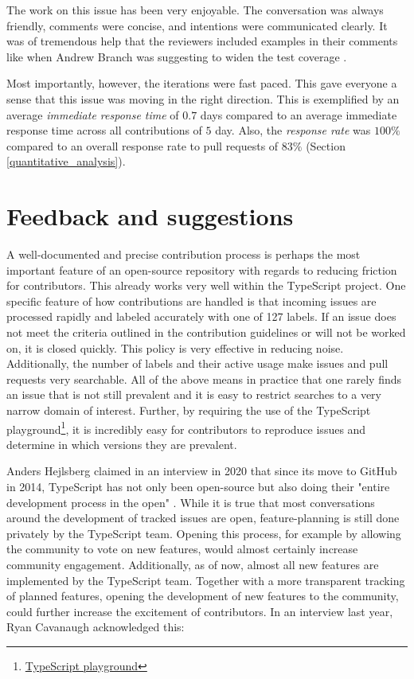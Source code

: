 \documentclass[12pt]{scrartcl}
\begin{document}
The work on this issue has been very enjoyable. The conversation was always friendly, comments were concise, and intentions were communicated clearly. It was of tremendous help that the reviewers included examples in their comments like when Andrew Branch was suggesting to widen the test coverage \cite{41928Comment4}.

Most importantly, however, the iterations were fast paced. This gave everyone a sense that this issue was moving in the right direction. This is exemplified by an average \textit{immediate response time} of $0.7$ days compared to an average immediate response time across all contributions of $5$ day. Also, the \textit{response rate} was $100\%$ compared to an overall response rate to pull requests of $83\%$ (Section \ref{quantitative_analysis}).

\section{Feedback and suggestions}
\label{feedback}

A well-documented and precise contribution process is perhaps the most important feature of an open-source repository with regards to reducing friction for contributors. This already works very well within the TypeScript project. One specific feature of how contributions are handled is that incoming issues are processed rapidly and labeled accurately with one of 127 labels. If an issue does not meet the criteria outlined in the contribution guidelines or will not be worked on, it is closed quickly. This policy is very effective in reducing noise. Additionally, the number of labels and their active usage make issues and pull requests very searchable. All of the above means in practice that one rarely finds an issue that is not still prevalent and it is easy to restrict searches to a very narrow domain of interest. Further, by requiring the use of the TypeScript playground\footnote{\href{https://www.typescriptlang.org/play}{TypeScript playground}}, it is incredibly easy for contributors to reproduce issues and determine in which versions they are prevalent.

Anders Hejlsberg claimed in an interview in 2020 that since its move to GitHub in 2014, TypeScript has not only been open-source but also doing their "entire development process in the open" \cite{Tung2020}. While it is true that most conversations around the development of tracked issues are open, feature-planning is still done privately by the TypeScript team. Opening this process, for example by allowing the community to vote on new features, would almost certainly increase community engagement. Additionally, as of now, almost all new features are implemented by the TypeScript team. Together with a more transparent tracking of planned features, opening the development of new features to the community, could further increase the excitement of contributors. In an interview last year, Ryan Cavanaugh acknowledged this:
\end{document}

